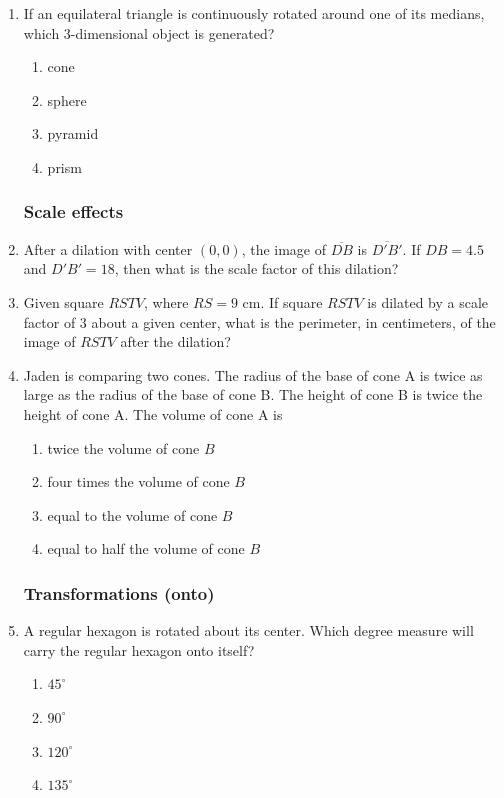 \documentclass[12pt, oneside]{article}
\begin{document}
\begin{enumerate}[itemsep=0cm]
\item If an equilateral triangle is continuously rotated around one of its medians, which 3-dimensional object is generated?
    \begin{enumerate}
      \item cone
      \item sphere
      \item pyramid
      \item prism
    \end{enumerate}

\subsubsection*{Scale effects}
\item After a dilation with center $(0,0)$, the image of $\overline{DB}$ is $\overline{D'B'}$. If $DB=4.5$ and $D'B'=18$, then what is the scale factor of this dilation?

\item Given square $RSTV$, where $RS=9$ cm. If square $RSTV$ is dilated by a scale factor of 3 about a given center, what is the perimeter, in centimeters, of the image of $RSTV$ after the dilation?

\item Jaden is comparing two cones. The radius of the base of cone A is
twice as large as the radius of the base of cone B. The height of cone
B is twice the height of cone A. The volume of cone A is
\begin{enumerate}
  \item twice the volume of cone $B$
  \item four times the volume of cone $B$
  \item equal to the volume of cone $B$
  \item equal to half the volume of cone $B$
\end{enumerate}


\newpage
\subsubsection*{Transformations (onto)}
\item A regular hexagon is rotated about its center. Which degree measure will carry the regular hexagon onto itself? 
\begin{multicols}{2}
  \begin{enumerate}
    \item $45^\circ$
    \item $90^\circ$
    \item $120^\circ$
    \item $135^\circ$
  \end{enumerate}
\end{multicols}


\end{enumerate}
\end{document}
